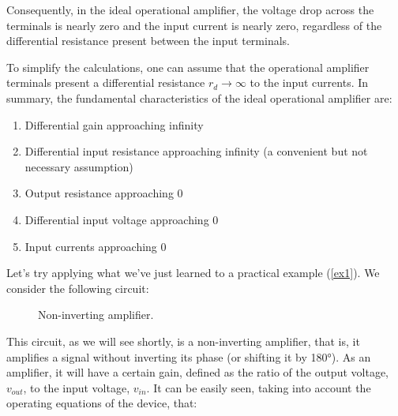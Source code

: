 \documentclass[../main.tex]{subfiles}
\begin{document}
Consequently, in the ideal operational amplifier, the voltage drop across the terminals is nearly zero and the input current is nearly zero, regardless of the differential resistance present between the input terminals. 

To simplify the calculations, one can assume that the operational amplifier terminals present a differential resistance $r_d \rightarrow \infty$ to the input currents. 
In summary, the fundamental characteristics of the ideal operational amplifier are:

\begin{enumerate}
	\item[\textbf{-}] Differential gain approaching infinity \\
	\item[\textbf{-}] Differential input resistance approaching infinity (a convenient but not necessary assumption)
	\item[\textbf{-}]Output resistance approaching 0
	\item[\textbf{-}]Differential input voltage approaching 0
	\item[\textbf{-}]Input currents approaching 0
\end{enumerate}

Let's try applying what we've just learned to a practical example (\autoref{ex1}). We consider the following circuit:

\begin{figure}[h]
\begin{center}
	

\label{ex1}
\caption{Non-inverting amplifier.}	
\end{center}	
\end{figure}

This circuit, as we will see shortly, is a non-inverting amplifier, that is, it amplifies a signal without inverting its phase (or shifting it by 180°). 
As an amplifier, it will have a certain gain, defined as the ratio of the output voltage, $v_{out}$, to the input voltage, $v_{in}$. 
It can be easily seen, taking into account the operating equations of the
device, that:
\end{document}
